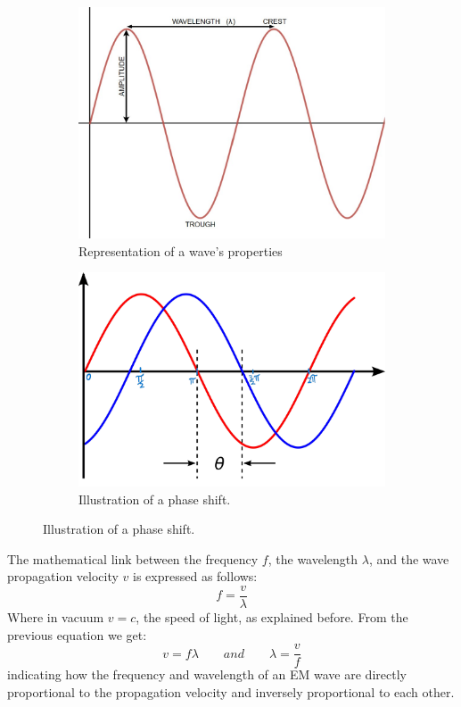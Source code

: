 \documentclass[binding=0.7cm, oneside]{sapthesis}
\begin{document}
\begin{figure}[h!]
    \centering
    \begin{subfigure}{0.48\textwidth}
        \includegraphics[width=\textwidth]{images/wave.jpg}
        \caption{Representation of a wave’s properties}
        \label{fig:wave}
    \end{subfigure}
    \hfill
    \begin{subfigure}{0.48\textwidth}
        \includegraphics[width=\textwidth]{images/Phase_shift2.png}
        \caption{Illustration of a phase shift.}
        \label{fig:phase}
    \end{subfigure}
\end{figure}
The mathematical link between the frequency $f$, the wavelength $\lambda$, and the
wave propagation velocity $v$ is expressed as follows:
$$ f = \frac{v}{\lambda} $$
Where in vacuum $v = c$, the speed of light, as explained before. From the previous equation we get:
$$ v = f\lambda \qquad and \qquad \lambda = \frac{v}{f} $$
indicating how the frequency and wavelength of an EM wave are directly proportional to the propagation velocity and inversely proportional to each other.
\end{document}
